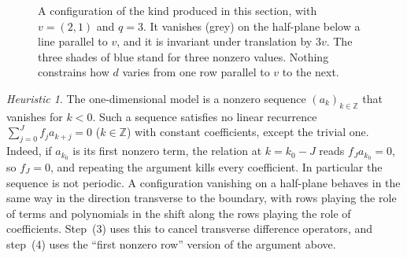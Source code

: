 \documentclass[11pt,a4paper,reqno]{amsart}
\theoremstyle{definition}
\theoremstyle{remark}
\newtheorem{heuristic}[theorem]{Heuristic}
\newcommand{\Z}{\mathbb Z}
\numberwithin{equation}{section}
\begin{document}
\begin{figure}[ht]
\centering
{}
\caption{A configuration of the kind produced in this section, with $v=(2,1)$ and $q=3$. It vanishes (grey) on the half-plane below a line parallel to $v$, and it is invariant under translation by $3v$. The three shades of blue stand for three nonzero values. Nothing constrains how $d$ varies from one row parallel to $v$ to the next.}
\label{fig:difference}
\end{figure}

\begin{heuristic}
The one-dimensional model is a nonzero sequence $(a_k)_{k\in\Z}$ that vanishes for $k<0$. Such a sequence satisfies no linear recurrence $\sum_{j=0}^Jf_ja_{k+j}=0$ ($k\in\Z$) with constant coefficients, except the trivial one. Indeed, if $a_{k_0}$ is its first nonzero term, the relation at $k=k_0-J$ reads $f_Ja_{k_0}=0$, so $f_J=0$, and repeating the argument kills every coefficient. In particular the sequence is not periodic. A configuration vanishing on a half-plane behaves in the same way in the direction transverse to the boundary, with rows playing the role of terms and polynomials in the shift along the rows playing the role of coefficients. Step~(3) uses this to cancel transverse difference operators, and step~(4) uses the ``first nonzero row'' version of the argument above.
\end{heuristic}
\end{document}
